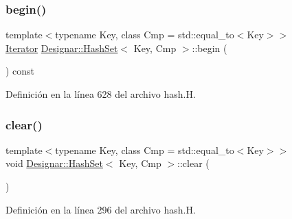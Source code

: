 \mbox{\label{class_designar_1_1_hash_set_a5b52ed8084a3a6e9c97dd90f690cf520}} 
\subsubsection{\texorpdfstring{begin()}{begin()}\hspace{0.1cm}{\footnotesize\ttfamily [2/2]}}
{\footnotesize\ttfamily template$<$typename Key, class Cmp = std\+::equal\+\_\+to$<$\+Key$>$$>$ \\
\hyperlink{class_designar_1_1_hash_set_1_1_iterator}{Iterator} \hyperlink{class_designar_1_1_hash_set}{Designar\+::\+Hash\+Set}$<$ Key, Cmp $>$\+::begin (\begin{DoxyParamCaption}{ }\end{DoxyParamCaption}) const\hspace{0.3cm}{\ttfamily [inline]}}



Definición en la línea 628 del archivo hash.\+H.

\mbox{\label{class_designar_1_1_hash_set_a9f2acc5d38a16b2bfe8586ecea9d2df7}} 
\subsubsection{\texorpdfstring{clear()}{clear()}}
{\footnotesize\ttfamily template$<$typename Key, class Cmp = std\+::equal\+\_\+to$<$\+Key$>$$>$ \\
void \hyperlink{class_designar_1_1_hash_set}{Designar\+::\+Hash\+Set}$<$ Key, Cmp $>$\+::clear (\begin{DoxyParamCaption}{ }\end{DoxyParamCaption})\hspace{0.3cm}{\ttfamily [inline]}}



Definición en la línea 296 del archivo hash.\+H.

\mbox{\label{class_designar_1_1_hash_set_ab3be22892d61b954068510bbdd6f6df8}} 
